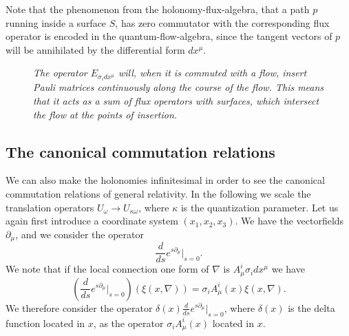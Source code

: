 \documentclass[12pt]{article}
\def\m{\mu}
\def\oo{\omega}
\begin{document}
Note that the phenomenon from the holonomy-flux-algebra, that a path $p$ running inside a surface $S$, has zero commutator with the corresponding flux operator is encoded in the quantum-flow-algebra, since the tangent vectors of $p$ will be annihilated by the differential form $dx^\m$. 
   


\begin{figure}[t]
\begin{center}
\resizebox{!}{ 4 cm}{
 }
\end{center}
\caption{\it The operator $E_{\sigma_i dx^\m}$ will, when it is commuted with a flow, insert Pauli matrices continuously along the course of the flow. This means that it acts as a sum of flux operators with surfaces, which intersect the flow at the points of insertion. }
 \label{heltvildtsvedig}
\end{figure}


  
  \subsection{The canonical commutation relations}


We can also make the holonomies infinitesimal in order to see the canonical commutation relations of general relativity. In the following we scale the translation operators $U_\oo\rightarrow U_{\kappa\oo}$, where $\kappa$ is the quantization parameter. Let us again first introduce a coordinate system $(x_1,x_2,x_3)$. We have the vectorfields $\partial_\m$, and we consider the operator
$$ \frac{d}{ds} e^{s\partial_\m}|_{s=0}  .$$ 
We note that if the local connection one form of $\nabla $ is $A_\m^i\sigma_i dx^\m$ we have 
 $$( \frac{d}{ds} e^{s\partial_\m}|_{s=0})(\xi (x,\nabla)) = \sigma_i A_\m^i(x) \xi (x,\nabla) . $$
We therefore consider the operator $\delta(x) \frac{d}{ds} e^{s\partial_\m}|_{s=0}$, where $\delta(x)$ is the delta function located in $x$, as the operator $\sigma_i A^i_\m(x)$ located in $x$.  
 
\end{document}

